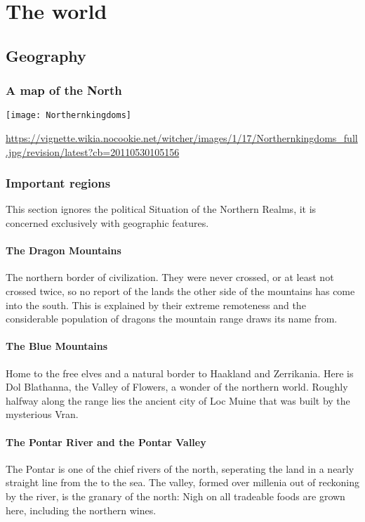 \documentclass[parskip=full,11pt]{scrreport}
\begin{document}
\chapter{The world}
\section{Geography}
\subsection{A map of the North}
\begin{center}
	\texttt{[image: Northernkingdoms]}
	\begin{tiny}\url{https://vignette.wikia.nocookie.net/witcher/images/1/17/Northernkingdoms_full.jpg/revision/latest?cb=20110530105156}\end{tiny}
\end{center}

\subsection{Important regions}\label{region:dragonMtns}
This section ignores the political Situation of the Northern Realms, it is concerned exclusively with geographic features.
\subsubsection{The Dragon Mountains}
The northern border of civilization. They were never crossed, or at least not crossed twice, so no report of the lands the other side of the mountains has come into the south.
This is explained by their extreme remoteness and the considerable population of dragons the mountain range draws its name from.

\subsubsection{The Blue Mountains}\label{region:blueMtns}
Home to the free elves and a natural border to Haakland and Zerrikania. Here is Dol Blathanna, the Valley of Flowers, a wonder of the northern world.
Roughly halfway along the range lies the ancient city of Loc Muine that was built by the mysterious Vran.

\subsubsection{The Pontar River and the Pontar Valley}\label{region:pontar}
The Pontar is one of the chief rivers of the north, seperating the land in a nearly straight line from the  to the sea.
The valley, formed over millenia out of reckoning by the river, is the granary of the north: Nigh on all tradeable foods are grown here,
including the northern wines.
\end{document}
